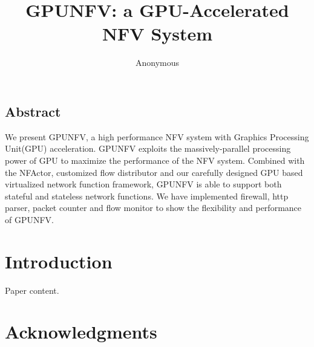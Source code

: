 \documentclass{apnet17}
\begin{document}
 {}
\date{}


\title{GPUNFV: a GPU-Accelerated NFV System}

\author{Anonymous}

\maketitle


\subsection*{Abstract}

We present GPUNFV, a high performance NFV system with Graphics Processing Unit(GPU) acceleration. GPUNFV exploits the massively-parallel processing power of GPU to maximize the performance of the NFV system. Combined with the NFActor, customized flow distributor and our carefully designed GPU based virtualized network function framework, GPUNFV is able to support both stateful and stateless network functions. We have implemented firewall, http parser, packet counter and flow monitor to show the flexibility and performance of GPUNFV. 

\section{Introduction}

Paper content.

\section*{Acknowledgments}


\begin{small}

\end{small}
\label{last-page}
\end{document}
